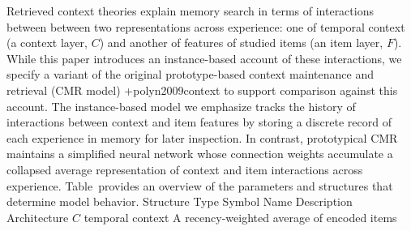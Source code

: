 Retrieved context theories explain memory search in terms of interactions between between two representations across experience: one of temporal context (a context layer, $C$) and another of features of studied items (an item layer, $F$). While this paper introduces an instance-based account of these interactions, we specify a variant of the original prototype-based context maintenance and retrieval (CMR model) +{}{}{polyn2009context} to support comparison against this account. The instance-based model we emphasize tracks the history of interactions between context and item features by storing a discrete record of each experience in memory for later inspection. In contrast, prototypical CMR maintains a simplified neural network whose connection weights accumulate a collapsed average representation of context and item interactions across experience. Table provides an overview of the parameters and structures that determine model behavior.\markdownRendererInterblockSeparator
{}%
{{Structure Type}%
{Symbol}%
{Name}%
{Description}%
}%
{{Architecture}%
{}%
{}%
{}%
}%
{{$C$}%
{temporal context}%
{A recency-weighted average of encoded items}%
{}%
}%
\relax